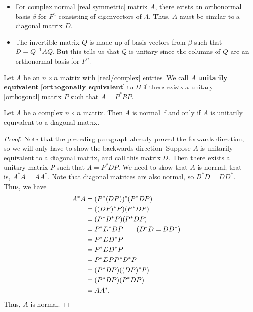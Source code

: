 \begin{itemize}
    \item For complex normal [real symmetric] matrix \( A  \), there exists an orthonormal basis \( \beta  \) for \( F^{n} \) consisting of eigenvectors of \( A  \). Thus, \( A  \) must be similar to a diagonal matrix \( D  \).
    \item The invertible matrix \( Q  \) is made up of basis vectors from \( \beta  \) such that \( D = Q^{-1} A Q  \). But this tells us that \( Q  \) is unitary since the columns of \( Q  \) are an orthonormal basis for \( F^{n} \).
\end{itemize}

\begin{definition}
    Let \( A  \) be an \( n \times n  \) matrix with [real/complex] entries. We call \( A  \) \textbf{unitarily equivalent} [\textbf{orthogonally equivalent}] to \( B  \) if there exists a unitary [orthogonal] matrix \( P  \) such that \( A = P^{*}BP \).
\end{definition}

\begin{theorem}\label{Theorem 6.19}
   Let \( A  \) be a complex \( n \times n  \) matrix. Then \( A  \) is normal if and only if \( A  \) is unitarily equivalent to a diagonal matrix. 
\end{theorem}
\begin{proof} Note that the preceding paragraph already proved the forwards direction, so we will only have to show the backwards direction. Suppose \( A  \) is unitarily equivalent to a diagonal matrix, and call this matrix \( D  \). Then there exists a unitary matrix \( P  \) such that \( A = P^{*} D P  \). We need to show that \( A  \) is normal; that is, \( A^{*}A = A A^{*} \). Note that diagonal matrices are also normal, so \( D^{*}D = DD^{*} \). Thus, we have 
    \begin{align*}
        A^{*}A &= (P^{*}(DP))^{*} (P^{*} D P) \\
               &= ((DP)^{*} P) (P^{*} D P) \\
               &= (P^{*}D^{*}P)(P^{*} D P) \\
               &=  P^{*}D^{*}DP \tag{\( D^{*}D = D D^{*} \)} \\
               &= P^{*}D D^{*} P \\
               &= P^{*} D D^{*}P \\
               &= P^{*} D P P^{*} D^{*} P \\
               &= (P^{*} D P) ((DP)^{*} P) \\
               &= (P^{*} D P) (P^{*} D P) \\
               &= A A^{*}. 
    \end{align*}
    Thus, \( A  \) is normal.

\end{proof}

